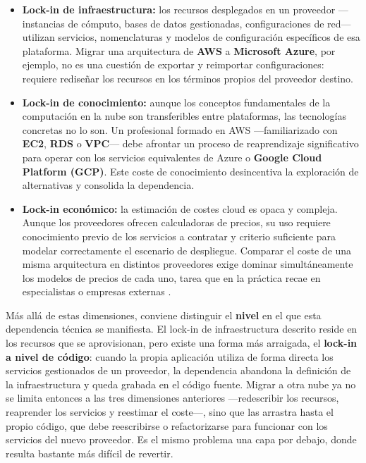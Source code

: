 \begin{itemize}
    \item \textbf{Lock-in de infraestructura:} los recursos desplegados en un
    proveedor —instancias de cómputo, bases de datos gestionadas, configuraciones
    de red— utilizan servicios, nomenclaturas y modelos de configuración específicos
    de esa plataforma. Migrar una arquitectura de \textbf{AWS} a
    \textbf{Microsoft Azure}, por ejemplo, no es una cuestión de exportar y
    reimportar configuraciones: requiere rediseñar los recursos en los términos
    propios del proveedor destino.

    \item \textbf{Lock-in de conocimiento:} aunque los conceptos fundamentales
    de la computación en la nube son transferibles entre plataformas, las
    tecnologías concretas no lo son. Un profesional formado en AWS —familiarizado
    con \textbf{EC2}, \textbf{RDS} o \textbf{VPC}— debe afrontar un proceso de
    reaprendizaje significativo para operar con los servicios equivalentes de Azure
    o \textbf{Google Cloud Platform (GCP)}. Este coste de conocimiento desincentiva
    la exploración de alternativas y consolida la dependencia.

    \item \textbf{Lock-in económico:} la estimación de costes cloud es opaca y
    compleja. Aunque los proveedores ofrecen calculadoras de precios, su uso
    requiere conocimiento previo de los servicios a contratar y criterio suficiente
    para modelar correctamente el escenario de despliegue. Comparar el coste de
    una misma arquitectura en distintos proveedores exige dominar simultáneamente
    los modelos de precios de cada uno, tarea que en la práctica recae en
    especialistas o empresas externas \cite{flexera2026}.
\end{itemize}

Más allá de estas dimensiones, conviene distinguir el \textbf{nivel} en el que esta
dependencia técnica se manifiesta. El lock-in de infraestructura descrito reside en los
recursos que se aprovisionan, pero existe una forma más arraigada, el \textbf{lock-in a
nivel de código}: cuando la propia aplicación utiliza de forma directa los servicios
gestionados de un proveedor, la dependencia abandona la definición de la infraestructura
y queda grabada en el código fuente. Migrar a otra nube ya no se limita entonces a las
tres dimensiones anteriores —redescribir los recursos, reaprender los servicios y
reestimar el coste—, sino que las arrastra hasta el propio código, que debe reescribirse
o refactorizarse para funcionar con los servicios del nuevo proveedor. Es el mismo
problema una capa por debajo, donde resulta bastante más difícil de revertir.

